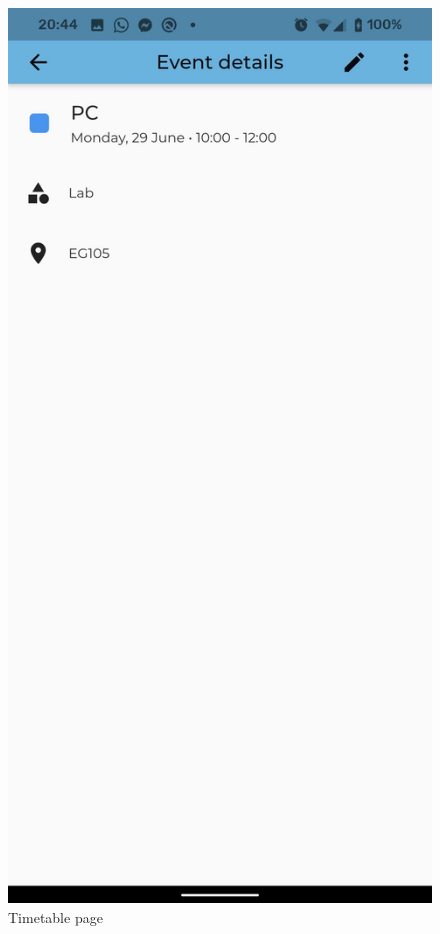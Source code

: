 \begin{figure}[!ht]
\begin{minipage}[b]{0.26\textwidth}
        \caption{Timetable page}
        \label{4:fig:timetable}
    \end{minipage}
    \hfill
    \begin{minipage}[b]{0.26\textwidth}
        \captionsetup{justification=centering}
        \includegraphics[width=\textwidth]{figures/app/flutter/event.jpg}

\end{minipage}
\end{figure}
